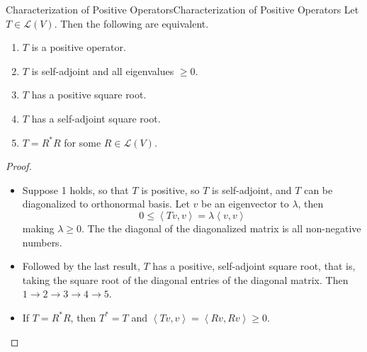 \documentclass[../main.tex]{subfiles}
\begin{document}
\begin{theorem}{Characterization of Positive Operators}{Characterization of Positive Operators}
Let $T\in \mathscr{L}(V)$. Then the following are equivalent.
\begin{enumerate}
	\item $T$ is a positive operator.
	\item $T$ is self-adjoint and all eigenvalues $\geq 0$.
	\item $T$ has a positive square root.
	\item $T$ has a self-adjoint square root.
	\item $T=R^*R$ for some $R\in \mathscr{L}(V)$.
\end{enumerate}
\end{theorem}

\begin{proof}
\begin{itemize}
\item Suppose 1 holds, so that $T$ is positive, so $T$ is self-adjoint, and $T$ can be diagonalized to orthonormal basis. Let  $v$ be an eigenvector to $\lambda$, then
	\begin{equation*}
	0 \leq \left<Tv,v\right> = \lambda \left<v,v\right>
	\end{equation*}
	making $\lambda \geq 0$. The the diagonal of the diagonalized matrix is all non-negative numbers.
\item Followed by the last result, $T$ has a positive, self-adjoint square root, that is, taking the square root of the diagonal entries of the diagonal matrix. Then $1 \rightarrow 2 \rightarrow 3 \rightarrow 4 \rightarrow 5$.
\item If $T=R^*R$, then $T^* = T$ and $\left<Tv,v\right> = \left<Rv,Rv\right> \geq 0$.
\end{itemize}
\end{proof}
\end{document}

